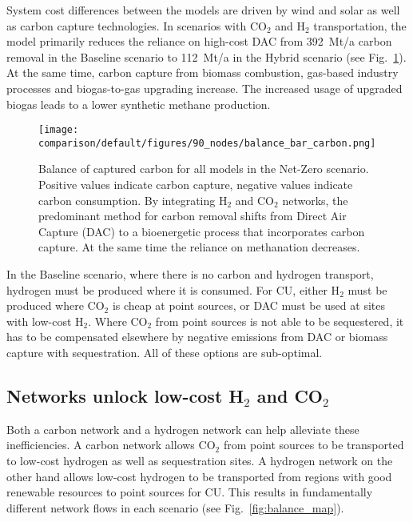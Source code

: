 \documentclass[twocolumn]{article}
\newcommand{\COtwo}{CO$_2$}
\newcommand{\Htwo}{H$_2$}
\newcommand{\carbon}{CO$_2$}
\newcommand{\hydrogen}{H$_2$}
\newcommand{\baselinescenario}{Baseline scenario}
\newcommand{\hybridscenario}{Hybrid scenario}
\begin{document}
System cost differences between the models are driven by wind and solar as well as carbon capture technologies. In scenarios with \carbon{} and \hydrogen{} transportation, the model primarily reduces the reliance on high-cost DAC from 392~Mt/a carbon removal in the \baselinescenario{} to 112~Mt/a in the \hybridscenario{} (see Fig.~\ref{fig:balance_captured_carbon}). At the same time, carbon capture from biomass combustion, gas-based industry processes and biogas-to-gas upgrading increase. The increased usage of upgraded biogas leads to a lower synthetic methane production.
\begin{figure}[ht!]
    \centering
    \texttt{[image: comparison/default/figures/90\_nodes/balance\_bar\_carbon.png]}
    \caption{Balance of captured carbon for all models in the Net-Zero scenario. Positive values indicate carbon capture, negative values indicate carbon consumption. By integrating \Htwo{} and \COtwo{} networks, the predominant method for carbon removal shifts from Direct Air Capture (DAC) to a bioenergetic process that incorporates carbon capture. At the same time the reliance on methanation decreases.}
    \label{fig:balance_captured_carbon}
\end{figure}

In the \baselinescenario{}, where there is no carbon and hydrogen transport, hydrogen must be produced where it is consumed. For CU, either \hydrogen{} must be produced where \carbon{} is cheap at point sources, or DAC must be used at sites with low-cost \hydrogen{}. Where \carbon{} from point sources is not able to be sequestered, it has to be compensated elsewhere by negative emissions from DAC or biomass capture with sequestration. All of these options are sub-optimal.

\subsection*{Networks unlock low-cost \hydrogen{} and \carbon{}}

Both a carbon network and a hydrogen network can help alleviate these inefficiencies. A carbon network allows \carbon{} from point sources to be transported to low-cost hydrogen as well as sequestration sites. A hydrogen network on the other hand allows low-cost hydrogen to be transported from regions with good renewable resources to point sources for CU. This results in fundamentally different network flows in each scenario (see Fig.~\ref{fig:balance_map}).
\end{document}
